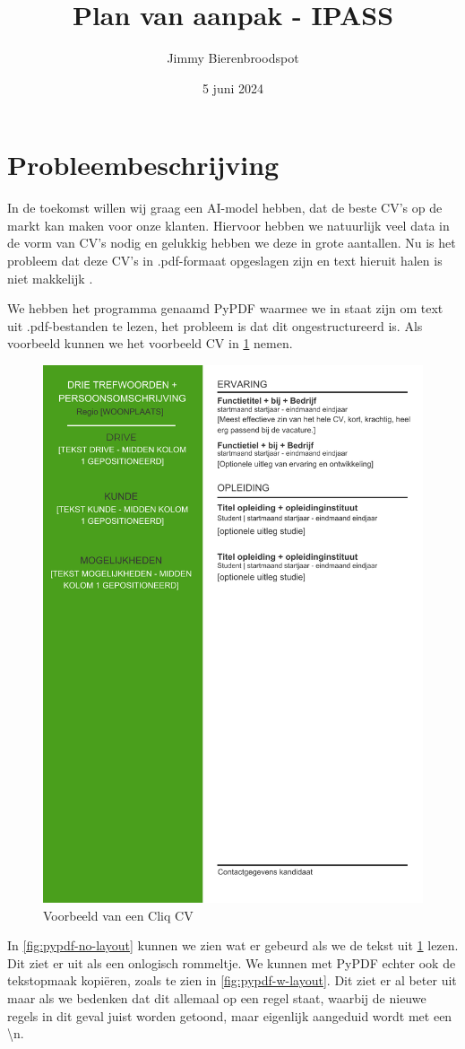 \documentclass{article}
\title{Plan van aanpak - IPASS}
\author{Jimmy Bierenbroodspot}
\date{5 juni 2024}
\begin{document}
\begin{titlepage}
  \maketitle
\end{titlepage}

\section{Probleembeschrijving}

In de toekomst willen wij graag een AI-model hebben, dat de beste CV's op de
markt kan maken voor onze klanten. Hiervoor hebben we natuurlijk veel data in de
vorm van CV's nodig en gelukkig hebben we deze in grote aantallen. Nu is het
probleem dat deze CV's in .pdf-formaat opgeslagen zijn en text hieruit halen is
niet makkelijk \cite{timalsina-2024}.

We hebben het programma genaamd PyPDF\cite{unknown-author-2024} waarmee we in
staat zijn om text uit .pdf-bestanden te lezen, het probleem is dat dit
ongestructureerd is. Als voorbeeld kunnen we het voorbeeld CV in \ref{fig:cv-example}
nemen.

\begin{figure}[ht]
  \begin{center}
    \includegraphics[width=0.5\linewidth]{pdf/voorbeeld_aicv_cv.pdf}
  \end{center}
  \caption{Voorbeeld van een Cliq CV}
  \label{fig:cv-example}
\end{figure}

In \ref{fig:pypdf-no-layout} kunnen we zien wat er gebeurd als we de tekst
uit \ref{fig:cv-example} lezen. Dit ziet er uit als een onlogisch rommeltje.
We kunnen met PyPDF echter ook de tekstopmaak kopiëren, zoals te zien in
\ref{fig:pypdf-w-layout}. Dit ziet er al beter uit maar als we bedenken dat
dit allemaal op een regel staat, waarbij de nieuwe regels in dit geval juist
worden getoond, maar eigenlijk aangeduid wordt met een \textbackslash n.
\end{document}
